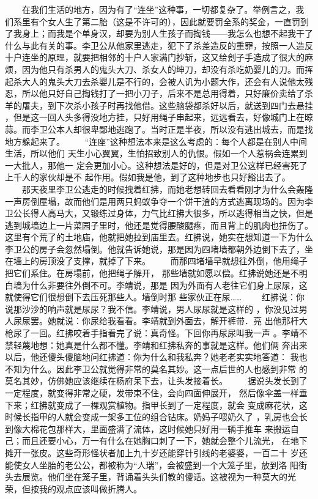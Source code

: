  　　在我们生活的地方，因为有了“连坐”这种事，一切都复杂了。举例言之，我 们系里有个女人生了第二胎（这是不许可的），因此就要罚全系的奖金，一直罚到 了我身上；而我是个单身汉，却要为别人生孩子而掏钱——我怎么也想不起我干了 什么与此有关的事。李卫公从他家里逃走，犯下了杀差造反的重罪，按照一人造反 十户连坐的原理，就要把相邻的十户人家满门抄斩，这又给刽子手造成了很大的麻 烦，因为他只有杀男人的鬼头大刀、杀女人的坤刀，却没有杀吃奶婴儿的刀。而挥 起杀大人的鬼头大刀去杀婴儿是不行的，会被人讥为小题大作，还会有人说他太残 忍，所以他只好自己掏钱打了一把小刀子，后来不是总用得着，只好廉价卖给了杀 羊的屠夫，到下次杀小孩子时再找他借。这些脑袋都杀好以后，就送到四门去悬挂 ，但是这一回人头多得没地方挂，只好用绳子串起来，远远看去，好像城门上在晾 蒜。而李卫公本人却很卑鄙地逃跑了。当时正是半夜，所以没有逃出城去，而是找 地方躲起来了。 　　“连座”这种想法本来是这么考虑的：每个人都是在别人中间生活，所以他们 天生小心翼翼，生怕招致别人的仇恨。假如一个人惹祸会连累到一大批人，那他一 定会更加小心。这种想法是好的，但是对卫公这样已经害死了上千人的家伙却是不 起作用。假如我是他，到了这种地步也只好豁出去了。 　　那天夜里李卫公逃走的时候拽着红拂，而她老想转回去看看刚才为什么会轰隆 一声房倒屋塌，故而他们是用两只蚂蚁争夺一个饼干渣的方式逃离现场的。因为李 卫公长得人高马大，又锻练过身体，力气比红拂大很多，所以逃得相当之快，但是 逃到城墙边上一片菜园子里时，他还是觉得腰酸腿疼，而且背上的肌肉也扭伤了。 这里有个荒了的土地庙，他就把她拉到庙里去。红拂说，她实在想知道一下为什么 李卫公的房子会忽然塌倒。他就告诉她说，那是因为四堵墙都朝外边倒下去了，坐 在墙上的房顶没了支撑，就掉了下来。 　　而那四堵墙早就想往外倒，他用绳子把它们系住。在房塌前，他把绳子解开， 那些墙就如愿以偿。红拂说她还是不明白墙为什么非要往外倒不可。李靖说，那是 因为外面有人老往它们身上尿尿，这就使得它们很想倒下去压死那些人。墙倒时那 些家伙正在尿…… 　　红拂说：你说那沙沙的响声就是尿尿？我不信。李靖说，男人尿尿就是这样的 ，你没见过男人尿尿罢。她就说：你尿给我看看。李靖就到外面去，解开裤带．亮 出他那杆大枪尿了一回。红拂咬着手指看完了说：真奇怪。下回你再尿尿叫我一声 。李靖不禁轻蔑地想：她真是什么都不懂。李靖和红拂私奔的事就是这样。他们俩 奔出来以后，他还傻头傻脑地问红拂道：你为什么和我私奔？她老老实实地答道： 我也不知为什么。因此李卫公就觉得非常的莫名其妙。这一点后世的人也感到非常 的莫名其妙，仿佛她应该继续在杨府呆下去，让头发接着长。 　　据说头发长到了一定程度，就变得非常之硬，发带束不住，会向四面伸展开， 然后像伞盖一样垂下来；红拂就变成了一棵观赏植物。指甲长到了一定程度，就会 变成麻花状，这时候长指甲的人就会变成一架多工位的组合钻床。奶妈子喂奶久了 ，乳房也会长到像大棉花包那样大，里面盛满了流体，这时候她只好用一辆手推车 来搬运自己；而且还要小心，万一有什么在她胸口刺了一下，她就会整个儿流光， 在地下摊开一张皮。这些奇形怪状者加上九十岁还能穿针引线的老婆婆，一百二十 岁还能使女人坐胎的老公公，都被称为“人瑞”，会被盛到一个大笼子里，放到洛 阳街头去展览。他们坐在笼子里，背诵着头头们教的傻话。这被视为一种莫大的光 荣，但按我的观点应该叫做折腾人。 